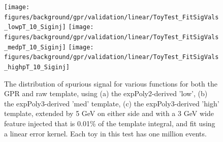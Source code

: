 \begin{figure} 
\begin{center}
  \texttt{[image: figures/background/gpr/validation/linear/ToyTest\_FitSigVals\_lowpT\_10\_Siginj]}   
  \texttt{[image: figures/background/gpr/validation/linear/ToyTest\_FitSigVals\_medpT\_10\_Siginj]}   
  \texttt{[image: figures/background/gpr/validation/linear/ToyTest\_FitSigVals\_highpT\_10\_Siginj]}   
\caption{The distribution of spurious signal for various functions for both the GPR and raw template, using (a) the expPoly2-derived 'low', (b) the expPoly3-derived 'med' template, (c) the expPoly3-derived 'high' template, extended by 5 GeV on either side and with a 3 GeV wide feature injected that is 0.01\% of the template integral, and fit using a linear error kernel. Each toy in this test has one million events.}
\label{fig:linearkernel_lowpt_10_Siginj}
\end{center}
\end{figure}

